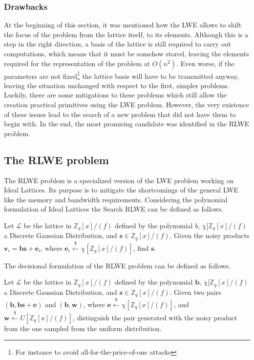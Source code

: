\subsubsection{Drawbacks}
At the beginning of this section, it was mentioned how the LWE allows to shift the focus of the problem from the lattice itself, to its elements. Although this is a step in the right direction, a basis of the lattice is still required to carry out computations, which means that it must be somehow stored, leaving the elements required for the representation of the problem at $O(n^2)$. Even worse, if the parameters are not fixed\footnote{For instance to avoid all-for-the-price-of-one attacks} the lattice basis will have to be transmitted anyway, leaving the situation unchanged with respect to the first, simpler problems.\\
Luckily, there are some mitigations to these problems which still allow the creation practical primitives using the LWE problem. However, the very existence of these issues lead to the search of a new problem that did not have them to begin with. In the end, the most promising candidate was identified in the RLWE problem.

\subsection{The RLWE problem}
The RLWE problem is a specialized version of the LWE problem working on Ideal Lattices. Its purpose is to mitigate the shortcomings of the general LWE like the memory and bandwidth requirements. Considering the polynomial formulation of Ideal Lattices the Search RLWE can be defined as follows.

\begin{definition}
Let $\mathscr{L}$ be the lattice in $\mathbb{Z}_q[x]/(f)$ defined by the polynomial $b$, $\chi[\mathbb{Z}_q[x]/(f)$ a Discrete Gaussian Distribution, and $\mathbf{s}\in\mathbb{Z}_q[x]/(f)$. Given the noisy products $\mathbf{v}_i=\mathbf{bs} + \mathbf{e}_i$, where $\mathbf{e}_i\xleftarrow{\$}\chi[\mathbb{Z}_q[x]/(f)]$, find $\mathbf{s}$.
\end{definition}

The decisional formulation of the RLWE problem can be defined as follows.

\begin{definition}
\sloppy Let $\mathscr{L}$ be the lattice in $\mathbb{Z}_q[x]/(f)$ defined by the polynomial $\mathbf{b}$, $\chi[\mathbb{Z}_q[x]/(f)$ a Discrete Gaussian Distribution, and \mbox{$\mathbf{s}\in\mathbb{Z}_q[x]/(f)$}. Given two pairs $(\mathbf{b},\mathbf{bs} + \mathbf{e})$ and $(\mathbf{b},\mathbf{w})$, where \mbox{$\mathbf{e}\xleftarrow{\$}\chi[\mathbb{Z}_q[x]/(f)]$}, and \mbox{$\mathbf{w}\xleftarrow{\$}U[\mathbb{Z}_q[x]/(f)]$}, distinguish the pair generated with the noisy product from the one sampled from the uniform distribution. 
\end{definition}

